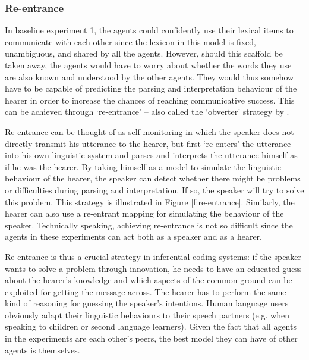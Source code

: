 \subsubsection{Re-entrance}
 In baseline experiment 1, the agents could confidently use their lexical items to communicate with each other since the lexicon in this model is fixed, unambiguous, and shared by all the agents. However, should this scaffold be taken away, the agents would have to worry about whether the words they use are also known and understood by the other agents. They would thus somehow have to be capable of predicting the parsing and interpretation behaviour of the hearer in order to increase the chances of reaching communicative success. This can be achieved through `re-entrance' 
\citep{steels03language} -- also called the `obverter' strategy by \citet{smith03intelligent}.

Re-entrance can be thought of as self-monitoring in which the speaker does not directly transmit his utterance to the hearer, but first `re-enters' the utterance into his own linguistic system and parses and interprets the utterance himself as if he was the hearer. By taking himself as a model to simulate the linguistic behaviour of the hearer, the speaker can detect whether there might be problems or difficulties during parsing and interpretation. If so, the speaker will try to solve this problem. This strategy is illustrated in Figure \ref{f:re-entrance}. Similarly, the hearer can also use a re-entrant mapping for simulating the behaviour of the speaker. Technically speaking, achieving re-entrance is not so difficult since the agents in these experiments can act both as a speaker and as a hearer.

Re-entrance is thus a crucial strategy in inferential coding systems: if the speaker wants to solve a problem through innovation, he needs to have an educated guess about the hearer's knowledge and which aspects of the common ground can be exploited for getting the message across. The hearer has to perform the same kind of reasoning for guessing the speaker's intentions. Human language users obviously adapt their linguistic behaviours to their speech partners (e.g. when speaking to children or second language learners). Given the fact that all agents in the experiments are each other's peers, the best model they can have of other agents is themselves.


